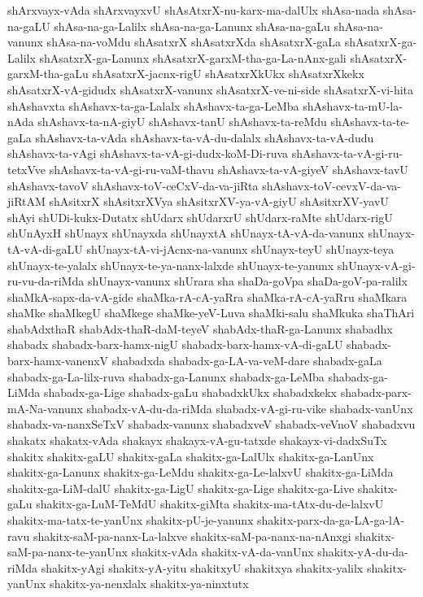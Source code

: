 {shArxvayx-vAda
shArxvayxvU
shAsAtxrX-nu-karx-ma-dalUlx
shAsa-nada
shAsa-na-gaLU
shAsa-na-ga-Lalilx
shAsa-na-ga-Lanunx
shAsa-na-gaLu
shAsa-na-vanunx
shAsa-na-voMdu
shAsatxrX
shAsatxrXda
shAsatxrX-gaLa
shAsatxrX-ga-Lalilx
shAsatxrX-ga-Lanunx
shAsatxrX-garxM-tha-ga-La-nAnx-gali
shAsatxrX-garxM-tha-gaLu
shAsatxrX-jacnx-rigU
shAsatxrXkUkx
shAsatxrXkekx
shAsatxrX-vA-gidudx
shAsatxrX-vanunx
shAsatxrX-ve-ni-side
shAsatxrX-vi-hita
shAshavxta
shAshavx-ta-ga-Lalalx
shAshavx-ta-ga-LeMba
shAshavx-ta-mU-la-nAda
shAshavx-ta-nA-giyU
shAshavx-tanU
shAshavx-ta-reMdu
shAshavx-ta-te-gaLa
shAshavx-ta-vAda
shAshavx-ta-vA-du-dalalx
shAshavx-ta-vA-dudu
shAshavx-ta-vAgi
shAshavx-ta-vA-gi-dudx-koM-Di-ruva
shAshavx-ta-vA-gi-ru-tetxVve
shAshavx-ta-vA-gi-ru-vaM-thavu
shAshavx-ta-vA-giyeV
shAshavx-tavU
shAshavx-tavoV
shAshavx-toV-ceCxV-da-va-jiRta
shAshavx-toV-cevxV-da-va-jiRtAM
shAsitxrX
shAsitxrXVya
shAsitxrXV-ya-vA-giyU
shAsitxrXV-yavU
shAyi
shUDi-kukx-Dutatx
shUdarx
shUdarxrU
shUdarx-raMte
shUdarx-rigU
shUnAyxH
shUnayx
shUnayxda
shUnayxtA
shUnayx-tA-vA-da-vanunx
shUnayx-tA-vA-di-gaLU
shUnayx-tA-vi-jAcnx-na-vanunx
shUnayx-teyU
shUnayx-teya
shUnayx-te-yalalx
shUnayx-te-ya-nanx-lalxde
shUnayx-te-yanunx
shUnayx-vA-gi-ru-vu-da-riMda
shUnayx-vanunx
shUrara
sha
shaDa-goVpa
shaDa-goV-pa-ralilx
shaMkA-sapx-da-vA-gide
shaMka-rA-cA-yaRra
shaMka-rA-cA-yaRru
shaMkara
shaMke
shaMkegU
shaMkege
shaMke-yeV-Luva
shaMki-salu
shaMkuka
shaThAri
shabAdxthaR
shabAdx-thaR-daM-teyeV
shabAdx-thaR-ga-Lanunx
shabadhx
shabadx
shabadx-barx-hamx-nigU
shabadx-barx-hamx-vA-di-gaLU
shabadx-barx-hamx-vanenxV
shabadxda
shabadx-ga-LA-va-veM-dare
shabadx-gaLa
shabadx-ga-La-lilx-ruva
shabadx-ga-Lanunx
shabadx-ga-LeMba
shabadx-ga-LiMda
shabadx-ga-Lige
shabadx-gaLu
shabadxkUkx
shabadxkekx
shabadx-parx-mA-Na-vanunx
shabadx-vA-du-da-riMda
shabadx-vA-gi-ru-vike
shabadx-vanUnx
shabadx-va-nanxSeTxV
shabadx-vanunx
shabadxveV
shabadx-veVnoV
shabadxvu
shakatx
shakatx-vAda
shakayx
shakayx-vA-gu-tatxde
shakayx-vi-dadxSuTx
shakitx
shakitx-gaLU
shakitx-gaLa
shakitx-ga-LalUlx
shakitx-ga-LanUnx
shakitx-ga-Lanunx
shakitx-ga-LeMdu
shakitx-ga-Le-lalxvU
shakitx-ga-LiMda
shakitx-ga-LiM-dalU
shakitx-ga-LigU
shakitx-ga-Lige
shakitx-ga-Live
shakitx-gaLu
shakitx-ga-LuM-TeMdU
shakitx-giMta
shakitx-ma-tAtx-du-de-lalxvU
shakitx-ma-tatx-te-yanUnx
shakitx-pU-je-yanunx
shakitx-parx-da-ga-LA-ga-lA-ravu
shakitx-saM-pa-nanx-La-lalxve
shakitx-saM-pa-nanx-na-nAnxgi
shakitx-saM-pa-nanx-te-yanUnx
shakitx-vAda
shakitx-vA-da-vanUnx
shakitx-yA-du-da-riMda
shakitx-yAgi
shakitx-yA-yitu
shakitxyU
shakitxya
shakitx-yalilx
shakitx-yanUnx
shakitx-ya-nenxlalx
shakitx-ya-ninxtutx
}
